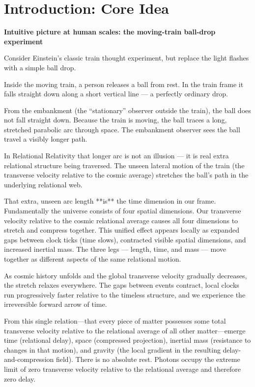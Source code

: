 \documentclass[11pt,a4paper]{article}
\begin{document}
\section{Introduction: Core Idea}

\textbf{Intuitive picture at human scales: the moving-train ball-drop experiment}

Consider Einstein’s classic train thought experiment, but replace the light flashes with a simple ball drop.  

Inside the moving train, a person releases a ball from rest. In the train frame it falls straight down along a short vertical line — a perfectly ordinary drop.  

From the embankment (the “stationary” observer outside the train), the ball does not fall straight down. Because the train is moving, the ball traces a long, stretched parabolic arc through space. The embankment observer sees the ball travel a visibly longer path.  

In Relational Relativity that longer arc is not an illusion — it is real extra relational structure being traversed. The unseen lateral motion of the train (the transverse velocity relative to the cosmic average) stretches the ball’s path in the underlying relational web.  

That extra, unseen arc length **is** the time dimension in our frame. Fundamentally the universe consists of four spatial dimensions. Our transverse velocity relative to the cosmic relational average causes all four dimensions to stretch and compress together. This unified effect appears locally as expanded gaps between clock ticks (time slows), contracted visible spatial dimensions, and increased inertial mass. The three legs — length, time, and mass — move together as different aspects of the same relational motion.

As cosmic history unfolds and the global transverse velocity gradually decreases, the stretch relaxes everywhere. The gaps between events contract, local clocks run progressively faster relative to the timeless structure, and we experience the irreversible forward arrow of time.

From this single relation—that every piece of matter possesses some total transverse velocity relative to the relational average of all other matter—emerge time (relational delay), space (compressed projection), inertial mass (resistance to changes in that motion), and gravity (the local gradient in the resulting delay-and-compression field). There is no absolute rest. Photons occupy the extreme limit of zero transverse velocity relative to the relational average and therefore zero delay.
\end{document}
